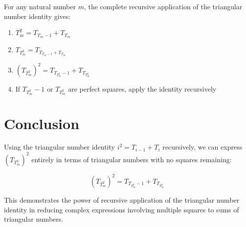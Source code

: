 \documentclass{article}
\begin{document}
For any natural number $m$, the complete recursive application of the triangular number identity gives:

\begin{enumerate}
\item $T_m^2 = T_{T_m-1} + T_{T_m}$
\item $T_{T_m^2} = T_{T_{T_m-1} + T_{T_m}}$
\item $(T_{T_m^2})^2 = T_{T_{T_m^2}-1} + T_{T_{T_m^2}}$
\item If $T_{T_m^2}-1$ or $T_{T_m^2}$ are perfect squares, apply the identity recursively
\end{enumerate}

\section{Conclusion}

Using the triangular number identity $i^2 = T_{i-1} + T_i$ recursively, we can express $(T_{T_m^2})^2$ entirely in terms of triangular numbers with no squares remaining:

\begin{equation}
(T_{T_m^2})^2 = T_{T_{T_m^2}-1} + T_{T_{T_m^2}}
\end{equation}

This demonstrates the power of recursive application of the triangular number identity in reducing complex expressions involving multiple squares to sums of triangular numbers.
\end{document}
